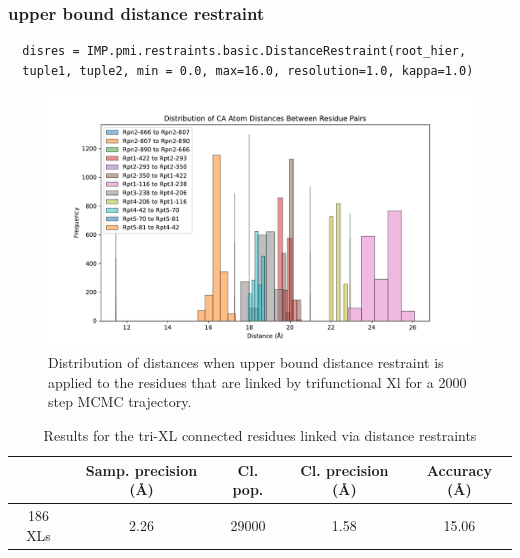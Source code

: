 \documentclass[a4paper,8pt]{beamer}
\begin{document}
%
\begin{frame}[fragile=singleslide]
\frametitle{upper bound distance restraint}
\begin{verbatim}
  disres = IMP.pmi.restraints.basic.DistanceRestraint(root_hier, 
  tuple1, tuple2, min = 0.0, max=16.0, resolution=1.0, kappa=1.0)
  \end{verbatim}
  \begin{figure}
    \centering
    \includegraphics[scale=0.2]{test-figures/disres_dist.pdf}
    \caption{Distribution of distances when upper bound distance restraint is 
    applied to the residues that are linked by trifunctional Xl for a 2000 step MCMC trajectory.}
  \end{figure}
  \begin{table}
    \centering
    \caption{Results for the tri-XL connected residues linked via distance restraints}
    \begin{tabular}{|c|c|c|c|c|}
        \hline
                                     & Samp. precision ({\AA}) & Cl. pop. & Cl. precision ({\AA}) & Accuracy ({\AA})\\ \hline
        186 XLs & 2.26  & 29000 & 1.58 & 15.06\\ \hline
    \end{tabular}
  \end{table}
\end{frame}
%
\end{document}
